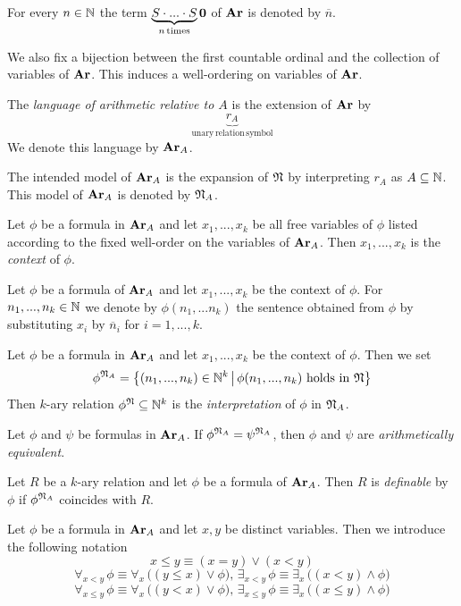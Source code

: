 \documentclass[10pt]{amsart}
\begin{document}
For every $n \in {\mathbb N}$ the term $\underbrace{S\cdot...\cdot S}_{n\,\mathrm{times}}\mathbf{0}$ of $\mathbf{Ar}$ is denoted by $\overline{n}$.

We also fix a bijection between the first countable ordinal and the collection of variables of $\mathbf{Ar}$. This induces a well-ordering on variables of $\mathbf{Ar}$.

\begin{definition}
	The \textit{language of arithmetic relative to $A$} is the extension of $\mathbf{Ar}$ by $$\underbrace{r_A}_{\mathrm{unary\,relation\,symbol}}$$
	We denote this language by $\mathbf{Ar}_A$.
\end{definition}
\noindent
The intended model of $\mathbf{Ar}_A$ is the expansion of ${\mathfrak N}$ by interpreting $r_A$ as $A \subseteq {\mathbb N}$. This model of $\mathbf{Ar}_A$ is denoted by ${\mathfrak N}_A$.

\begin{definition}
	Let $\phi$ be a formula in $\mathbf{Ar}_A$ and let $x_1,...,x_k$ be all free variables of $\phi$ listed according to the fixed well-order on the variables of $\mathbf{Ar}_A$. Then $x_1,...,x_k$ is the \textit{context} of $\phi$.
\end{definition}
\noindent
Let $\phi$ be a formula of $\mathbf{Ar}_A$ and let $x_1,...,x_k$ be the context of $\phi$. For $n_1,...,n_k\in {\mathbb N}$ we denote by $\phi(n_1,...n_k)$ the sentence obtained from $\phi$ by substituting $x_i$ by $\overline{n}_i$ for $i=1,...,k$.

\begin{definition}
	Let $\phi$ be a formula in $\mathbf{Ar}_A$ and let $x_1,...,x_k$ be the context of $\phi$. Then we set
	$$\phi^{{\mathfrak N}_A} = \big\{(n_1,...,n_k) \in {\mathbb N}^k\,\big|\,\phi(n_1,...,n_k)\mbox{ holds in }{\mathfrak N}\big\}$$
	Then $k$-ary relation $\phi^{{\mathfrak N}}\subseteq {\mathbb N}^k$ is the \textit{interpretation} of $\phi$ in ${\mathfrak N}_A$.
\end{definition}

\begin{definition}
	Let $\phi$ and $\psi$ be formulas in $\mathbf{Ar}_A$. If $\phi^{{\mathfrak N}_A} = \psi^{{\mathfrak N}_A}$, then $\phi$ and $\psi$ are \textit{arithmetically equivalent}.
\end{definition}

\begin{definition}
	Let $R$ be a $k$-ary relation and let $\phi$ be a formula of $\mathbf{Ar}_A$. Then $R$ is \textit{definable} by $\phi$ if $\phi^{{\mathfrak N}_A}$ coincides with $R$.
\end{definition}

\begin{remark}\label{remark:bounded_quantifiers}
	Let $\phi$ be a formula in $\mathbf{Ar}_A$ and let $x,y$ be distinct variables. Then we introduce the following notation
	$$x \leq y \equiv \left(x = y\right) \vee \left(x < y\right)$$
	$$\forall_{x < y}\,\phi \equiv \forall_x\,\big(\left(y \leq x\right)\vee \phi\big),\,\exists_{x < y}\,\phi \equiv \exists_x\,\big(\left(x < y\right)\wedge \phi\big)$$
	$$\forall_{x \leq y}\,\phi \equiv \forall_x\,\big(\left(y < x\right)\vee \phi\big),\,\exists_{x \leq y}\,\phi \equiv \exists_x\,\big(\left(x \leq y\right)\wedge \phi\big)$$
\end{remark}
\end{document}
